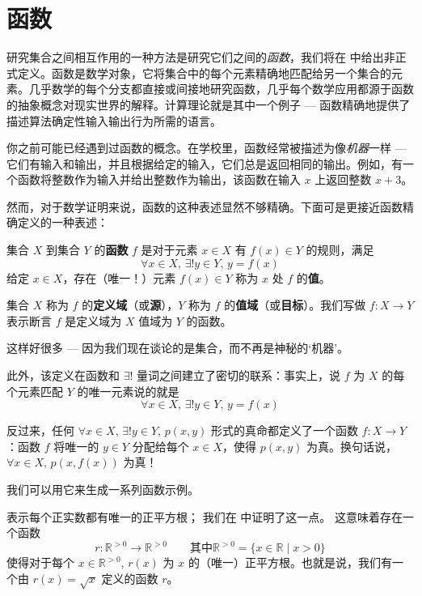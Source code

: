 \section{函数}

研究集合之间相互作用的一种方法是研究它们之间的\textit{函数}，我们将在  中给出非正式定义。函数是数学对象，它将集合中的每个元素精确地匹配给另一个集合的元素。几乎数学的每个分支都直接或间接地研究函数，几乎每个数学应用都源于函数的抽象概念对现实世界的解释。计算理论就是其中一个例子 --- 函数精确地提供了描述算法确定性输入输出行为所需的语言。

你之前可能已经遇到过函数的概念。在学校里，函数经常被描述为像\textit{机器}一样 --- 它们有输入和输出，并且根据给定的输入，它们总是返回相同的输出。例如，有一个函数将整数作为输入并给出整数作为输出，该函数在输入 $x$ 上返回整数 $x+3$。

然而，对于数学证明来说，函数的这种表述显然不够精确。下面可是更接近函数精确定义的一种表述：

\begin{definition}
\label{defFunction}
集合 $X$ 到集合 $Y$ 的\textbf{函数} $f$ 是对于元素 $x \in X$ 有 $f(x) \in Y$ 的规则，满足
\[ \forall x \in X,\, \exists ! y \in Y,\, y = f(x) \]
给定 $x \in X$，存在（唯一！）元素 $f(x) \in Y$ 称为 $x$ 处 $f$ 的\textbf{值}。

集合 $X$ 称为 $f$ 的\textbf{定义域}（或\textbf{源}），$Y$ 称为 $f$ 的\textbf{值域}（或\textbf{目标}）。我们写做 $f : X \to Y$  表示断言 $f$ 是定义域为 $X$ 值域为 $Y$ 的函数。
\end{definition}

这样好很多 --- 因为我们现在谈论的是集合，而不再是神秘的`机器'。

此外，该定义在函数和 $\exists !$ 量词之间建立了密切的联系：事实上，说 $f$ 为 $X$ 的每个元素匹配 $Y$ 的唯一元素说的就是
\[ \forall x \in X,\, \exists ! y \in Y,\, y = f(x) \]

反过来，任何 $\forall x \in X,\, \exists ! y \in Y,\, p(x,y)$ 形式的真命都定义了一个函数 $f : X \to Y$：函数 $f$ 将唯一的 $y \in Y$ 分配给每个 $x \in X$，使得 $p(x,y)$ 为真。换句话说，$\forall x \in X,\, p(x,f(x))$ 为真！

我们可以用它来生成一系列函数示例。

\begin{example}
\label{exPositiveSquareRootFunction}
 表示每个正实数都有唯一的正平方根； 我们在  中证明了这一点。 这意味着存在一个函数
\[ r : \mathbb{R}^{>0} \to \mathbb{R}^{>0} \qquad \text{其中} \mathbb{R}^{>0} = \{ x \in \mathbb{R} \mid x > 0 \} \]
使得对于每个 $x \in \mathbb{R}^{>0}$, $r(x)$ 为 $x$ 的（唯一）正平方根。也就是说，我们有一个由 $r(x)=\sqrt{x}$ 定义的函数 $r$。
\end{example}

